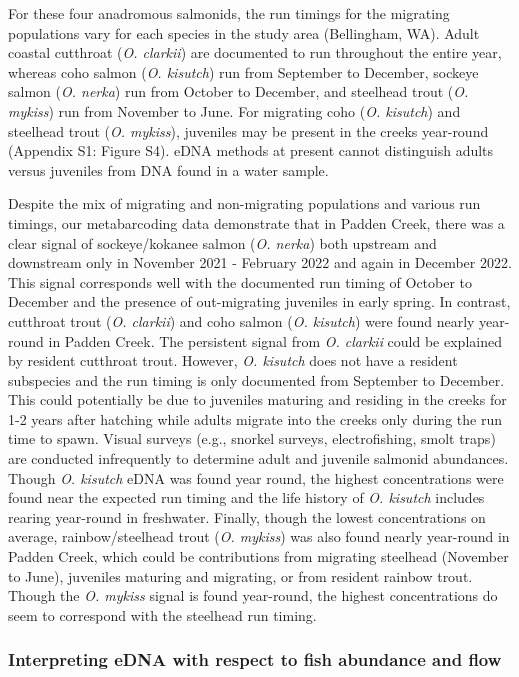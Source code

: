 \documentclass[
]{article}
\begin{document}
For these four anadromous salmonids, the run timings for the migrating
populations vary for each species in the study area (Bellingham, WA).
Adult coastal cutthroat (\emph{O. clarkii}) are documented to run
throughout the entire year, whereas coho salmon (\emph{O. kisutch}) run
from September to December, sockeye salmon (\emph{O. nerka}) run from
October to December, and steelhead trout (\emph{O. mykiss}) run from
November to June. For migrating coho (\emph{O. kisutch}) and steelhead
trout (\emph{O. mykiss}), juveniles may be present in the creeks
year-round (Appendix S1: Figure S4). eDNA methods at present cannot
distinguish adults versus juveniles from DNA found in a water sample.

Despite the mix of migrating and non-migrating populations and various
run timings, our metabarcoding data demonstrate that in Padden Creek,
there was a clear signal of sockeye/kokanee salmon (\emph{O. nerka})
both upstream and downstream only in November 2021 - February 2022 and
again in December 2022. This signal corresponds well with the documented
run timing of October to December and the presence of out-migrating
juveniles in early spring. In contrast, cutthroat trout (\emph{O.
clarkii}) and coho salmon (\emph{O. kisutch}) were found nearly
year-round in Padden Creek. The persistent signal from \emph{O. clarkii}
could be explained by resident cutthroat trout. However, \emph{O.
kisutch} does not have a resident subspecies and the run timing is only
documented from September to December. This could potentially be due to
juveniles maturing and residing in the creeks for 1-2 years after
hatching while adults migrate into the creeks only during the run time
to spawn. Visual surveys (e.g., snorkel surveys, electrofishing, smolt
traps) are conducted infrequently to determine adult and juvenile
salmonid abundances. Though \emph{O. kisutch} eDNA was found year round,
the highest concentrations were found near the expected run timing and
the life history of \emph{O. kisutch} includes rearing year-round in
freshwater. Finally, though the lowest concentrations on average,
rainbow/steelhead trout (\emph{O. mykiss}) was also found nearly
year-round in Padden Creek, which could be contributions from migrating
steelhead (November to June), juveniles maturing and migrating, or from
resident rainbow trout. Though the \emph{O. mykiss} signal is found
year-round, the highest concentrations do seem to correspond with the
steelhead run timing.

\hypertarget{interpreting-edna-with-respect-to-fish-abundance-and-flow}{%
\subsubsection{Interpreting eDNA with respect to fish abundance and
flow}\label{interpreting-edna-with-respect-to-fish-abundance-and-flow}}
\end{document}
